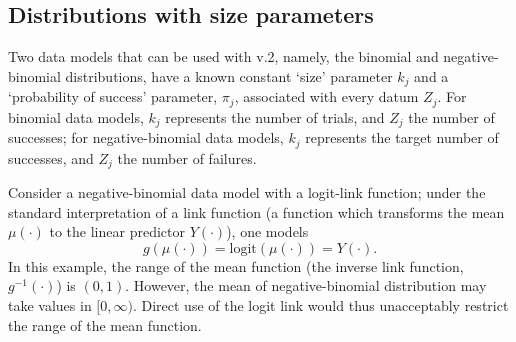 \documentclass[article]{jss}
\def\mbf#1{{%
\mathchoice%
{\hbox{\boldmath$\displaystyle{#1}$}}%
{\hbox{\boldmath$\textstyle{#1}$}}%
{\hbox{\boldmath$\scriptstyle{#1}$}}%
{\hbox{\boldmath$\scriptscriptstyle{#1}$}}%
}}
\def\vec{\mbf}
\newcommand{\logit}[1]{\text{logit}\!\left(#1\right)} %
\newcommand{\ECurly}[1]{\mathbb{E}\left\{#1\right\}} %
\newcommand{\ESquare}[1]{\mathbb{E}\left[#1\right]} %
\newcommand{\varCurly}[1]{{\rm var}\left\{#1\right\}} %
\newcommand{\varSquare}[1]{{\rm var}\left[#1\right]} %
\newcommand{\pmugivenZ}[1]{\hat{p}_{\mu|\vec{Z}}\left(#1\right)}
\begin{document}
\begin{appendix}
  
 

\section{Distributions with size parameters}\label{sec:Distributions with size parameters}

Two data models that can be used with  v.2, namely, the binomial and negative-binomial distributions, have a known constant `size' parameter $k_j$ and a `probability of success' parameter, $\pi_j$, associated with every datum $Z_j$.
For binomial data models, $k_j$ represents the number of trials, and $Z_j$ the number of successes; for negative-binomial data models, $k_j$ represents the target number of successes, and $Z_j$ the number of failures. 

Consider a negative-binomial data model with a logit-link function; under the standard interpretation of a link function (a function which transforms the mean $\mu(\cdot)$ to the linear predictor $Y(\cdot)$), one models 
\[
g(\mu(\cdot)) = \logit{\mu(\cdot)} = Y(\cdot).
\]
In this example, the range of the mean function (the inverse link function, $g^{-1}(\cdot)$) is $(0, 1)$.
However, the mean of negative-binomial distribution may take values in $[0, \infty)$. 
Direct use of the logit link would thus unacceptably restrict the range of the mean function.


\end{appendix}
\end{document}
